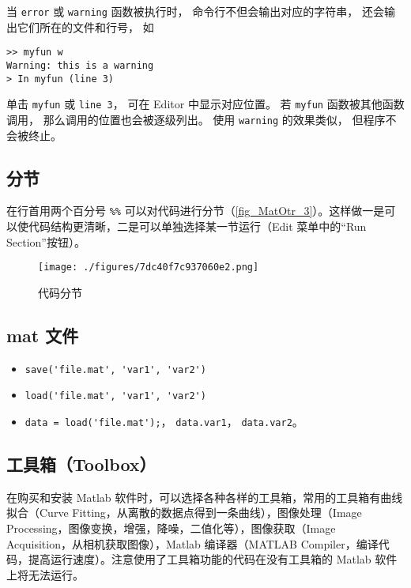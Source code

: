当 \verb|error| 或 \verb|warning| 函数被执行时， 命令行不但会输出对应的字符串， 还会输出它们所在的文件和行号， 如
\begin{lstlisting}[language=matlabC]
>> myfun w
Warning: this is a warning
> In myfun (line 3)
\end{lstlisting}
单击 \verb|myfun| 或 \verb|line 3|， 可在 Editor 中显示对应位置。 若 \verb|myfun| 函数被其他函数调用， 那么调用的位置也会被逐级列出。 使用 \verb|warning| 的效果类似， 但程序不会被终止。

\subsection{分节}
在行首用两个百分号 \verb|%%| 可以对代码进行分节（\autoref{fig_MatOtr_3}）。这样做一是可以使代码结构更清晰，二是可以单独选择某一节运行（Edit 菜单中的“Run Section”按钮）。
\begin{figure}[ht]
\centering
\texttt{[image: ./figures/7dc40f7c937060e2.png]}
\caption{代码分节}\label{fig_MatOtr_3}
\end{figure}

\subsection{mat 文件}
\begin{itemize}
\item \verb|save('file.mat', 'var1', 'var2')|
\item \verb|load('file.mat', 'var1', 'var2')|
\item \verb|data = load('file.mat');|， \verb|data.var1|， \verb|data.var2|。
\end{itemize}


\subsection{工具箱（Toolbox）}
在购买和安装 Matlab 软件时，可以选择各种各样的工具箱，常用的工具箱有曲线拟合（Curve Fitting，从离散的数据点得到一条曲线），图像处理（Image Processing，图像变换，增强，降噪，二值化等），图像获取（Image Acquisition，从相机获取图像），Matlab 编译器（MATLAB Compiler，编译代码，提高运行速度）。注意使用了工具箱功能的代码在没有工具箱的 Matlab 软件上将无法运行。




